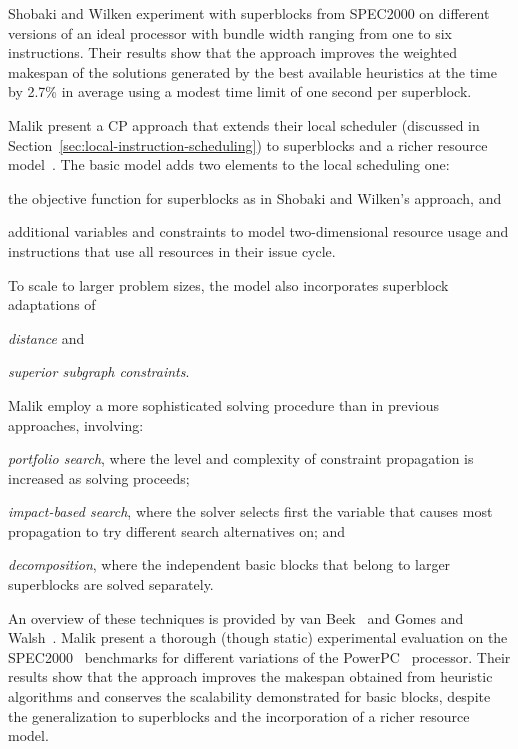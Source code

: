 \documentclass[acmsmall,authorversion,nonacm]{acmart}
\begin{document}
Shobaki and Wilken experiment with superblocks from SPEC2000 on
different versions of an ideal processor with bundle width ranging
from one to six instructions.
Their results show that the approach improves the weighted makespan of
the solutions generated by the best available heuristics at the time
by 2.7\% in average using a modest time limit of one second per
superblock.

Malik \etal{} present a CP approach that extends their local scheduler
(discussed in Section~\ref{sec:local-instruction-scheduling}) to
superblocks and a richer resource model~\cite{Malik2008b}.
The basic model adds two elements to the local scheduling one:
\begin{inparaitem}[]
\item the objective function for superblocks as in Shobaki and
  Wilken's approach, and
\item additional variables and constraints to model two-dimensional
  resource usage and instructions that use all resources in their
  issue cycle.
\end{inparaitem}
To scale to larger problem sizes, the model also incorporates
superblock adaptations of
\begin{inparaitem}[]
\item \emph{distance} and
\item \emph{superior subgraph constraints}.
\end{inparaitem}
Malik \etal{} employ a more sophisticated solving procedure than in
previous approaches, involving:
\begin{inparaitem}[]
\item \emph{portfolio search}, where the level and complexity of
  constraint propagation is increased as solving proceeds;
\item \emph{impact-based search}, where the solver selects first the
  variable that causes most propagation to try different search
  alternatives on; and
\item \emph{decomposition}, where the independent basic blocks that
  belong to larger superblocks are solved separately.
\end{inparaitem}
An overview of these techniques is provided by van
Beek~\cite{CPH:search} and Gomes and Walsh~\cite{CPH:random}.
Malik \etal{} present a thorough (though static) experimental
evaluation on the SPEC2000~\cite{CPU} benchmarks for different
variations of the PowerPC~\cite{Diefendorff1994} processor.
Their results show that the approach improves the makespan obtained
from heuristic algorithms and conserves the scalability demonstrated
for basic blocks, despite the generalization to superblocks and the
incorporation of a richer resource model.
\end{document}
